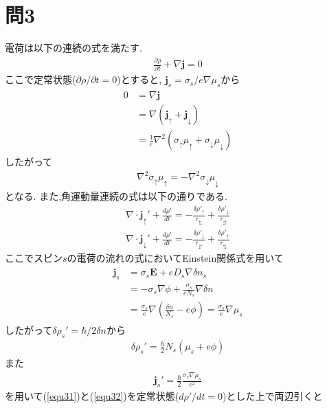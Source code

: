\documentclass[uplatex,a4j,11pt,dvipdfmx]{jsarticle}
\begin{document}
\section*{問3}
電荷は以下の連続の式を満たす.
\begin{align}
  \frac{\partial\rho}{\partial t}+\nabla{\bm j}=0
\end{align}
ここで定常状態($\partial\rho/\partial t=0$)とすると, ${\bm j}_s=\sigma_s/e\nabla\mu_s$から
\begin{align}
  \begin{split}
    0&=\nabla{\bm j}\\
    &=\nabla({\bm j}_\uparrow+{\bm j}_\downarrow)\\
    &=\frac{1}{e}\nabla^2(\sigma_\uparrow\mu_\uparrow+\sigma_\downarrow\mu_\downarrow)
  \end{split}
\end{align}
したがって
\begin{align}
  \label{equ30}
  \nabla^2\sigma_\uparrow\mu_\uparrow=-\nabla^2\sigma_\downarrow\mu_\downarrow
\end{align}
となる.
また,角運動量連続の式は以下の通りである.
\begin{align}
  \label{equ31}
  \nabla\cdot{\bm j}_\uparrow'+\frac{d\rho'}{dt}=-\frac{\delta\rho'_\uparrow}{\tau_\updownarrows}+\frac{\delta\rho'_\downarrow}{\tau_\downuparrows}\\
  \label{equ32}
  \nabla\cdot{\bm j}_\downarrow'+\frac{d\rho'}{dt}=-\frac{\delta\rho'_\downarrow}{\tau_\downuparrows}+\frac{\delta\rho'_\uparrow}{\tau_\updownarrows}
\end{align}
ここでスピン$s$の電荷の流れの式においてEinstein関係式を用いて
\begin{align}
  \begin{split}
    {\bm j}_s&=\sigma_s{\bm E}+eD_s\nabla\delta n_s\\
    &=-\sigma_s\nabla\phi+\frac{\sigma_s}{eN_s}\nabla\delta n\\
    &=\frac{\sigma_s}{e}\nabla\left(\frac{\delta n}{N_s}-e\phi\right)=\frac{\sigma_s}{e}\nabla\mu_s
  \end{split}
\end{align}
したがって$\delta\rho_s'=\hbar/2\delta n$から
\begin{align}
  \delta\rho_s'=\frac{\hbar}{2}N_s(\mu_s+e\phi)
\end{align}
また
\begin{align}
  {\bm j}_s'=\frac{\hbar}{2}\frac{\sigma_s\nabla\mu_s}{e^2}
\end{align}
を用いて(\ref{equ31})と(\ref{equ32})を定常状態($d\rho'/dt=0$)とした上で両辺引くと
\end{document}

